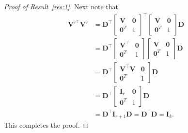\documentclass[11pt,a4paper]{article}
\theoremstyle{mybreak}
\numberwithin{dummy}{section}
\theoremstyle{plain}
\theoremstyle{plain}
\theoremstyle{plain}
\theoremstyle{plain}
\theoremstyle{MyNonumberplain}
\newtheorem{proof}{Proof}
\newcommand{\0}{\M{0}}
\newcommand{\M}[1]{\mathbf{#1}}
\newcommand{\T}{\top}
\begin{document}
\begin{proof}[Proof of Result~\ref{res:1}]
  Next note that
  \begin{align*}
    \M{V}'^\T \M{V}'
    &
      =
      \M{D}^\T
      \begin{bmatrix}
        \M{V} & \0
        \\
        \0^T & 1
      \end{bmatrix}^\T
               \begin{bmatrix}
                 \M{V} & \0
                 \\
                 \0^T & 1
               \end{bmatrix}
                        \M{D}
    \\
    & =
      \M{D}^\T
      \begin{bmatrix}
        \M{V}^\T & \0
        \\
        \0^T & 1
      \end{bmatrix}
               \begin{bmatrix}
                 \M{V} & \0
                 \\
                 \0^T & 1
               \end{bmatrix}
                        \M{D}
    \\
    & =
      \M{D}^\T
      \begin{bmatrix}
        \M{V}^\T \M{V} & \0
        \\
        \0^T & 1
      \end{bmatrix}
               \M{D}
    \\
    & =
      \M{D}^\T
      \begin{bmatrix}
        \M{I}_r & \0
        \\
        \0^T & 1
      \end{bmatrix}
               \M{D}
    \\
    & =
      \M{D}^\T \M{I}_{r+1} \M{D}
      = \M{D}^\T \M{D}
      = \M{I}_k.
  \end{align*}
  This completes the proof.
\end{proof}
\end{document}
